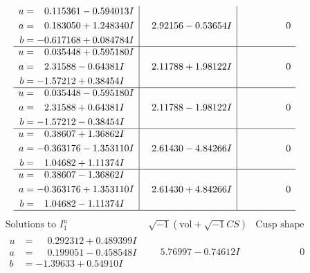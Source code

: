 \documentclass[1p]{elsarticle_modified}
\theoremstyle{definition}
\newcommand{\I}{\sqrt{-1}}
\begin{document}
$$\begin{array}{c|c|c}
\begin{aligned}
u &= \phantom{-}0.115361 - 0.594013 I \\
a &= \phantom{-}0.183050 + 1.248340 I \\
b &= -0.617168 + 0.084784 I\end{aligned}
 & \phantom{-}2.92156 - 0.53654 I & \phantom{-0.000000 } 0 \\ \hline\begin{aligned}
u &= \phantom{-}0.035448 + 0.595180 I \\
a &= \phantom{-}2.31588 - 0.64381 I \\
b &= -1.57212 + 0.38454 I\end{aligned}
 & \phantom{-}2.11788 + 1.98122 I & \phantom{-0.000000 } 0 \\ \hline\begin{aligned}
u &= \phantom{-}0.035448 - 0.595180 I \\
a &= \phantom{-}2.31588 + 0.64381 I \\
b &= -1.57212 - 0.38454 I\end{aligned}
 & \phantom{-}2.11788 - 1.98122 I & \phantom{-0.000000 } 0 \\ \hline\begin{aligned}
u &= \phantom{-}0.38607 + 1.36862 I \\
a &= -0.363176 - 1.353110 I \\
b &= \phantom{-}1.04682 + 1.11374 I\end{aligned}
 & \phantom{-}2.61430 - 4.84266 I & \phantom{-0.000000 } 0 \\ \hline\begin{aligned}
u &= \phantom{-}0.38607 - 1.36862 I \\
a &= -0.363176 + 1.353110 I \\
b &= \phantom{-}1.04682 - 1.11374 I\end{aligned}
 & \phantom{-}2.61430 + 4.84266 I & \phantom{-0.000000 } 0\\
 \hline 
 \end{array}$$\newpage$$\begin{array}{c|c|c}  
\text{Solutions to }I^u_{1}& \I (\text{vol} + \sqrt{-1}CS) & \text{Cusp shape}\\
 \hline 
\begin{aligned}
u &= \phantom{-}0.292312 + 0.489399 I \\
a &= \phantom{-}0.199051 - 0.458548 I \\
b &= -1.39633 + 0.54910 I\end{aligned}
 & \phantom{-}5.76997 - 0.74612 I & \phantom{-0.000000 } 0 \\ \hline\begin{aligned}

\end{aligned}
\end{array}$$
\end{document}
